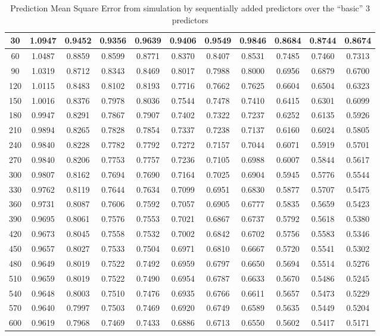 \begin{table}[h!]
{\begin{tabular}{||c c c c c c c c c c c||}
30 & 1.0947 & 0.9452 & 0.9356 & 0.9639 & 0.9406 & 0.9549 & 0.9846 & 0.8684 & 0.8744 & 0.8674 \\ \hline
        60 & 1.0487 & 0.8859 & 0.8599 & 0.8771 & 0.8370 & 0.8407 & 0.8531 & 0.7485 & 0.7460 & 0.7313 \\ \hline
        90 & 1.0319 & 0.8712 & 0.8343 & 0.8469 & 0.8017 & 0.7988 & 0.8000 & 0.6956 & 0.6879 & 0.6700 \\ \hline
        120 & 1.0115 & 0.8483 & 0.8102 & 0.8193 & 0.7716 & 0.7662 & 0.7625 & 0.6604 & 0.6504 & 0.6323 \\ \hline
        150 & 1.0016 & 0.8376 & 0.7978 & 0.8036 & 0.7544 & 0.7478 & 0.7410 & 0.6415 & 0.6301 & 0.6099 \\ \hline
        180 & 0.9947 & 0.8291 & 0.7867 & 0.7907 & 0.7402 & 0.7322 & 0.7237 & 0.6252 & 0.6135 & 0.5926 \\ \hline
        210 & 0.9894 & 0.8265 & 0.7828 & 0.7854 & 0.7337 & 0.7238 & 0.7137 & 0.6160 & 0.6024 & 0.5805 \\ \hline
        240 & 0.9840 & 0.8228 & 0.7782 & 0.7792 & 0.7272 & 0.7157 & 0.7044 & 0.6071 & 0.5919 & 0.5701 \\ \hline
        270 & 0.9840 & 0.8206 & 0.7753 & 0.7757 & 0.7236 & 0.7105 & 0.6988 & 0.6007 & 0.5844 & 0.5617 \\ \hline
        300 & 0.9807 & 0.8162 & 0.7694 & 0.7690 & 0.7164 & 0.7025 & 0.6904 & 0.5945 & 0.5776 & 0.5544 \\ \hline
        330 & 0.9762 & 0.8119 & 0.7644 & 0.7634 & 0.7099 & 0.6951 & 0.6830 & 0.5877 & 0.5707 & 0.5475 \\ \hline
        360 & 0.9731 & 0.8087 & 0.7606 & 0.7592 & 0.7057 & 0.6905 & 0.6777 & 0.5835 & 0.5659 & 0.5423 \\ \hline
        390 & 0.9695 & 0.8061 & 0.7576 & 0.7553 & 0.7021 & 0.6867 & 0.6737 & 0.5792 & 0.5618 & 0.5380 \\ \hline
        420 & 0.9673 & 0.8045 & 0.7558 & 0.7532 & 0.7002 & 0.6842 & 0.6702 & 0.5756 & 0.5583 & 0.5346 \\ \hline
        450 & 0.9657 & 0.8027 & 0.7533 & 0.7504 & 0.6971 & 0.6810 & 0.6667 & 0.5720 & 0.5541 & 0.5302 \\ \hline
        480 & 0.9649 & 0.8019 & 0.7522 & 0.7492 & 0.6959 & 0.6797 & 0.6650 & 0.5694 & 0.5514 & 0.5276 \\ \hline
        510 & 0.9659 & 0.8019 & 0.7522 & 0.7490 & 0.6954 & 0.6787 & 0.6633 & 0.5670 & 0.5486 & 0.5245 \\ \hline
        540 & 0.9648 & 0.8003 & 0.7510 & 0.7476 & 0.6935 & 0.6766 & 0.6611 & 0.5657 & 0.5473 & 0.5229 \\ \hline
        570 & 0.9640 & 0.7997 & 0.7503 & 0.7469 & 0.6920 & 0.6749 & 0.6589 & 0.5635 & 0.5449 & 0.5204 \\ \hline
        600 & 0.9619 & 0.7968 & 0.7469 & 0.7433 & 0.6886 & 0.6713 & 0.6550 & 0.5602 & 0.5417 & 0.5171 \\ \hline 
\hline
\end{tabular}}
\caption{Prediction Mean Square Error from simulation by sequentially added predictors over the “basic” 3 predictors}
\label{table:PMSE}
\end{table}


